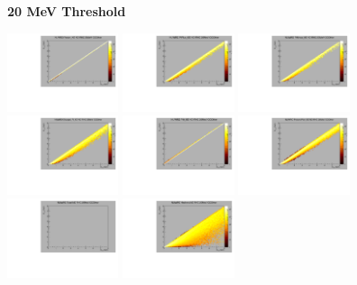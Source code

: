 \textbf{20 MeV Threshold}

\begin{center}

  \includegraphics[width=0.245\textwidth]{plots/response_matrix/Proton_KE_RHC_CCOther_20MeV.pdf}
  \includegraphics[width=0.245\textwidth]{plots/response_matrix/PiPlus_KE_RHC_CCOther_20MeV.pdf}
  \includegraphics[width=0.245\textwidth]{plots/response_matrix/PiMinus_KE_RHC_CCOther_20MeV.pdf}
  \includegraphics[width=0.245\textwidth]{plots/response_matrix/Charged_Pi_KE_RHC_CCOther_20MeV.pdf}
  \includegraphics[width=0.245\textwidth]{plots/response_matrix/Pi0_KE_RHC_CCOther_20MeV.pdf}
  \includegraphics[width=0.245\textwidth]{plots/response_matrix/Proton+Pion_KE_RHC_CCOther_20MeV.pdf}
  \includegraphics[width=0.245\textwidth]{plots/response_matrix/Total_RHC_CCOther_20MeV.pdf}
  \includegraphics[width=0.245\textwidth]{plots/response_matrix/Hadrons_RHC_CCOther_20MeV.pdf}

\end{center}

